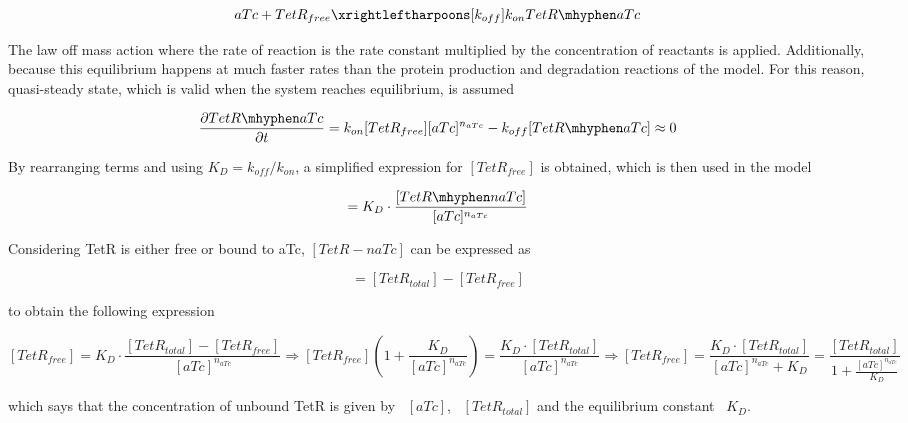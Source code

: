 \begin{equation}
    aTc + TetR_{free} \xrightleftharpoons[k_{off}]{k_{on}} TetR \mhyphen aTc
\end{equation}

The law off mass action where the rate of reaction is the rate
constant multiplied by the concentration of reactants is applied.
Additionally, because this equilibrium happens at much faster rates than the protein production and degradation reactions of the model.
For this reason, quasi-steady state, which is valid when the system reaches equilibrium, is assumed

\begin{equation}
    \pdv{TetR \mhyphen aTc}{t} = k_{on}[TetR_{free}][aTc]^{n_{aTc}} - k_{off}[TetR \mhyphen aTc] \approx 0
\end{equation}


By rearranging terms and using $K_{D} = k_{off}/k_{on}$, a simplified expression for $[TetR_{free}]$ is obtained,
which is then used in the model

\begin{equation}
[TetR_{free}] = K_{D}\cdot \frac{[TetR \mhyphen naTc]}{[aTc]^{n_{aTc}}}
\end{equation}

Considering TetR is either free or bound to aTc, $[TetR-naTc]$ can be expressed as

\begin{equation}
[TetR \mhyphen naTc] = [TetR_{total}] - [TetR_{free}]
\end{equation}

to obtain the following expression

\begin{subequations}
    \begin{equation}
    [TetR_{free}] = K_{D} \cdot \frac{[TetR_{total}] - [TetR_{free}]}{[aTc]^{n_{aTc}}} \Longrightarrow
    \end{equation}
    \begin{equation}
    [TetR_{free}] (1+\frac{K_{D}}{[aTc]^{n_{aTc}}}) = \frac{K_{D}\cdot [TetR_{total}]}{[aTc]^{n_{aTc}}}\Longrightarrow
    \end{equation}
    \begin{equation}
    [TetR_{free}] = \frac{K_{D}\cdot[TetR_{total}]}{[aTc]^{n_{aTc}}+K_{D}} = \frac{[TetR_{total}]}{1+\frac{[aTc]^{n_{aTc}}}{K_{D}}}
    \end{equation}
\end{subequations}

which says that the concentration of unbound TetR is given by ~$[aTc]$,
~$[TetR_{total}]$ and the equilibrium constant ~$K_{D}$.

